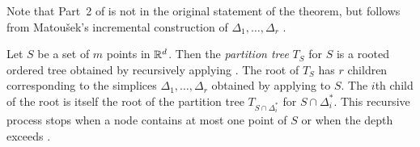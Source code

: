 \documentclass{patmorin}
\begin{document}
Note that Part~2 of  is not in the original
statement of the theorem, but follows from Matou\v{s}ek's incremental
construction of $\Delta_1,\ldots,\Delta_r$ \cite{m92}.

%
%
%

Let $S$ be a set of $m$ points in $\mathbb{R}^d$. Then the \emph{partition
tree} $T_S$ for $S$ is a rooted ordered tree obtained by recursively
applying .  The root of $T_S$ has $r$ children
corresponding to the simplices $\Delta_1,\ldots,\Delta_{r}$ obtained
by applying  to $S$. The $i$th child of the
root is itself the root of the partition tree $T_{S\cap\Delta_i^*}$ for
$S\cap\Delta_i^*$. This recursive process stops when a node contains at
most one point of $S$ or when the depth exceeds .
\end{document}
